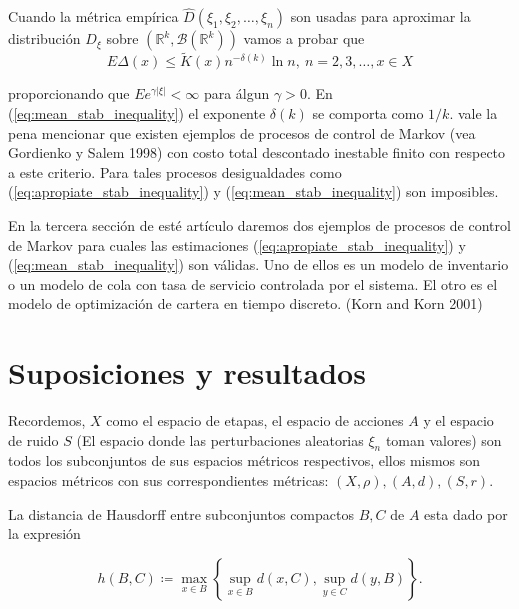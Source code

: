 \documentclass[11pt, spanish]{amsart}
\begin{document}
Cuando la métrica empírica $\widehat{D}\left(\xi_{1},\xi_{2},\ldots,\xi_{n}\right)$
son usadas para aproximar la distribución $D_{\xi}$ sobre $\left(\mathbb{R}^{k},\mathcal{B}\left(\mathbb{R}^{k}\right)\right)$
vamos a probar que 
\begin{equation}
E\Delta\left(x\right)\leq\widetilde{K}\left(x\right)n^{-\delta\left(k\right)}\ln n,\ n=2,3,\ldots,x\in X\label{eq:mean_stab_inequality}
\end{equation}

proporcionando que $Ee^{\gamma\left|\xi\right|}<\infty$ para álgun
$\gamma>0$. En (\ref{eq:mean_stab_inequality}) el exponente $\delta\left(k\right)$
se comporta como $1/k$. vale la pena mencionar que existen ejemplos
de procesos de control de Markov (vea Gordienko y Salem 1998) con
costo total descontado inestable finito con respecto a este criterio.
Para tales procesos desigualdades como (\ref{eq:apropiate_stab_inequality})
y (\ref{eq:mean_stab_inequality}) son imposibles.

En la tercera sección de esté artículo daremos dos ejemplos de procesos
de control de Markov para cuales las estimaciones (\ref{eq:apropiate_stab_inequality})
y (\ref{eq:mean_stab_inequality}) son válidas. Uno de ellos es un
modelo de inventario o un modelo de cola con tasa de servicio controlada
por el sistema. El otro es el modelo de optimización de cartera en
tiempo discreto. (Korn and Korn 2001)

\section{Suposiciones y resultados\label{sec:Suposiciones-y-resultados}}

Recordemos, $X$ como el espacio de etapas, el espacio de acciones
$A$ y el espacio de ruido $S$ (El espacio donde las perturbaciones
aleatorias $\xi_{n}$ toman valores) son todos los subconjuntos de
sus espacios métricos respectivos, ellos mismos son espacios métricos
con sus correspondientes métricas: $\left(X,\rho\right),\left(A,d\right),\left(S,r\right)$. 

La distancia de Hausdorff entre subconjuntos compactos $B,C$ de $A$
esta dado por la expresión 

\[
h\left(B,C\right)\coloneqq\max_{x\in B}\left\{ \sup_{x\in B}d\left(x,C\right),\sup_{y\in C}d\left(y,B\right)\right\} .
\]
\end{document}
